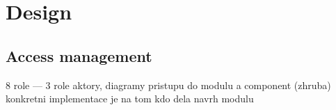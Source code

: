 \chapter{Design}


\section{Access management}
8 role --- 3 role
aktory, diagramy pristupu do modulu a component (zhruba) konkretni implementace je na tom kdo dela navrh modulu
